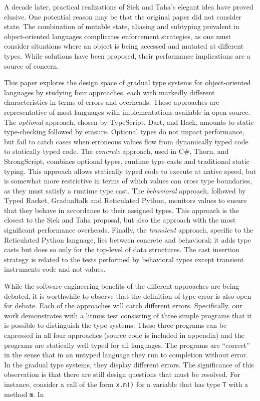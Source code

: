 \documentclass[runnningheads]{tex/llncs}
\newcommand{\code}[1]{{\tt #1}\xspace}
\begin{document}
A decade later, practical realizations of Siek and Taha's elegant idea have
proved elusive. One potential reason may be that the original paper did not
consider state. The combination of mutable state, aliasing and subtyping
prevalent in object-oriented languages complicates enforcement strategies,
as one must consider situations where an object is being accessed and
mutated at different types. While solutions have been proposed, their
performance implications are a source of concern.

This paper explores the design space of gradual type systems for
object-oriented languages by studying four approaches, each with markedly
different characteristics in terms of errors and overheads.  These
approaches are representative of most languages with implementations
available in open source. The \emph{optional} approach, chosen by
TypeScript, Dart, and Hack, amounts to static type-checking followed by
erasure. Optional types do not impact performance, but fail to catch cases
when erroneous values flow from dynamically typed code to statically typed
code.  The \emph{concrete} approach, used in C\#, Thorn, and StrongScript,
combines optional types, runtime type casts and traditional static
typing. This approach allows statically typed code to execute at native
speed, but is somewhat more restrictive in terms of which values can cross
type boundaries, as they must satisfy a runtime type cast. The
\emph{behavioral} approach, followed by Typed Racket, Gradualtalk and
Reticulated Python, monitors values to ensure that they behave in accordance
to their assigned types. This approach is the closest to the Siek and Taha
proposal, but also the approach with the most significant performance
overheads. Finally, the \emph{transient} approach, specific to the
Reticulated Python language, lies between concrete and behavioral; it adds
type casts but does so only for the top-level of data structures. The cast
insertion strategy is related to the tests performed by behavioral types
except transient instruments code and not values.


While the software engineering benefits of the different approaches are
being debated, it is worthwhile to observe that the definition of type error
is also open for debate.  Each of the approaches will catch different
errors. Specifically, our work demonstrates with a litmus test consisting of
three simple programs that it is possible to distinguish the type
systems. These three programs can be expressed in all four approaches
(source code is included in appendix) and the programs are statically well
typed for all languages. The programs are ``correct'' in the sense that in
an untyped language they run to completion without error. In the gradual
type systems, they display different errors.  The significance of this
observation is that there are still design questions that must be resolved.
For instance, consider a call of the form \code{x.m()} for a variable that
has type \code{T} with a method \code{m}.  In
\end{document}
